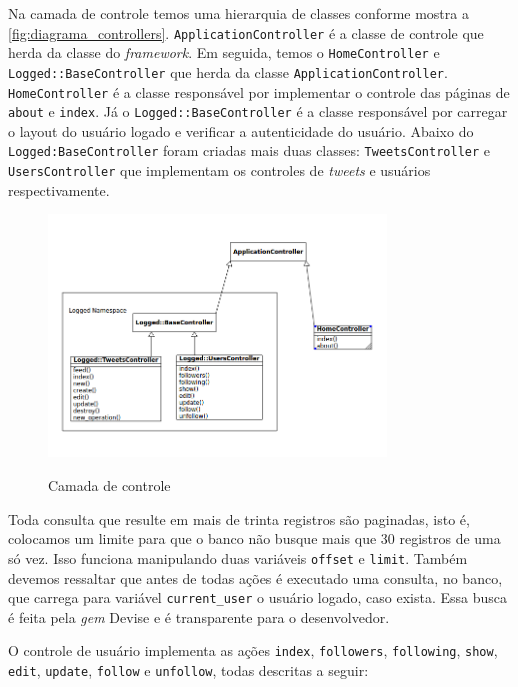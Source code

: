 Na camada de controle temos uma hierarquia de classes conforme mostra a \autoref{fig:diagrama_controllers}. \verb|ApplicationController| é a classe de controle que herda da classe do \textit{framework}. Em seguida, temos o \verb|HomeController| e \verb|Logged::BaseController| que herda  da classe \verb|ApplicationController|. \verb|HomeController| é a classe responsável por implementar o controle das páginas de \verb|about| e \verb|index|. Já o \verb|Logged::BaseController| é a classe responsável por carregar o layout do usuário logado e verificar a autenticidade do usuário.
Abaixo do \verb|Logged:BaseController| foram criadas mais duas classes: \verb|TweetsController| e \verb|UsersController| que implementam os controles de \textit{tweets} e usuários respectivamente.
\begin{figure}[H]
    \centering
    \caption{Camada de controle}
    \includegraphics[width=0.8\textwidth]{./04-figuras/controllers_complete.png}
    \label{fig:diagrama_controllers}
\end{figure}

Toda consulta que resulte em mais de trinta registros são paginadas, isto é, colocamos um limite para que o banco não busque mais que 30 registros de uma só vez. Isso funciona manipulando duas variáveis \verb|offset| e \verb|limit|. Também devemos ressaltar que
antes de todas ações é executado uma consulta, no banco, que carrega para variável \verb|current_user| o usuário logado, caso exista. Essa busca é feita pela \textit{gem} Devise e é transparente para o desenvolvedor.

O controle de usuário implementa as ações \verb|index|, \verb|followers|, \verb|following|, \verb|show|, \verb|edit|, \verb|update|, \verb|follow| e \verb|unfollow|, todas descritas a seguir:

